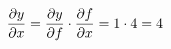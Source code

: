 \documentclass[preview]{standalone}
\begin{document}
\begin{align*}
\special{dvisvgm:raw <g id='unique000'>}\frac{\partial y}{\partial x} = \frac{\partial y}{\partial f} \cdot \frac{\partial f}{\partial x} = 1 \cdot 4 = 4\special{dvisvgm:raw </g>}
\end{align*}
\end{document}
